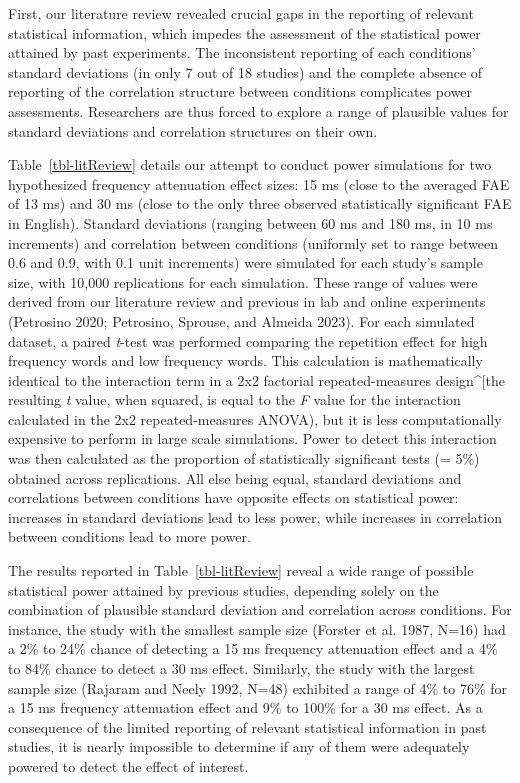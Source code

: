 \documentclass[
]{interact}
\begin{document}
First, our literature review revealed crucial gaps in the reporting of
relevant statistical information, which impedes the assessment of the
statistical power attained by past experiments. The inconsistent
reporting of each conditions' standard deviations (in only 7 out of 18
studies) and the complete absence of reporting of the correlation
structure between conditions complicates power assessments. Researchers
are thus forced to explore a range of plausible values for standard
deviations and correlation structures on their own.

Table~\ref{tbl-litReview} details our attempt to conduct power
simulations for two hypothesized frequency attenuation effect sizes: 15
ms (close to the averaged FAE of 13 ms) and 30 ms (close to the only
three observed statistically significant FAE in English). Standard
deviations (ranging between 60 ms and 180 ms, in 10 ms increments) and
correlation between conditions (uniformly set to range between 0.6 and
0.9, with 0.1 unit increments) were simulated for each study's sample
size, with 10,000 replications for each simulation. These range of
values were derived from our literature review and previous in lab and
online experiments (Petrosino 2020; Petrosino, Sprouse, and Almeida
2023). For each simulated dataset, a paired \emph{t}-test was performed
comparing the repetition effect for high frequency words and low
frequency words. This calculation is mathematically identical to the
interaction term in a 2x2 factorial repeated-measures design\^{}{[}the
resulting \emph{t} value, when squared, is equal to the \emph{F} value
for the interaction calculated in the 2x2 repeated-measures ANOVA), but
it is less computationally expensive to perform in large scale
simulations. Power to detect this interaction was then calculated as the
proportion of statistically significant tests (\alpha = 5\%) obtained
across replications. All else being equal, standard deviations and
correlations between conditions have opposite effects on statistical
power: increases in standard deviations lead to less power, while
increases in correlation between conditions lead to more power.

The results reported in Table~\ref{tbl-litReview} reveal a wide range of
possible statistical power attained by previous studies, depending
solely on the combination of plausible standard deviation and
correlation across conditions. For instance, the study with the smallest
sample size (Forster et al. 1987, N=16) had a 2\% to 24\% chance of
detecting a 15 ms frequency attenuation effect and a 4\% to 84\% chance
to detect a 30 ms effect. Similarly, the study with the largest sample
size (Rajaram and Neely 1992, N=48) exhibited a range of 4\% to 76\% for
a 15 ms frequency attenuation effect and 9\% to 100\% for a 30 ms
effect. As a consequence of the limited reporting of relevant
statistical information in past studies, it is nearly impossible to
determine if any of them were adequately powered to detect the effect of
interest.
\end{document}
